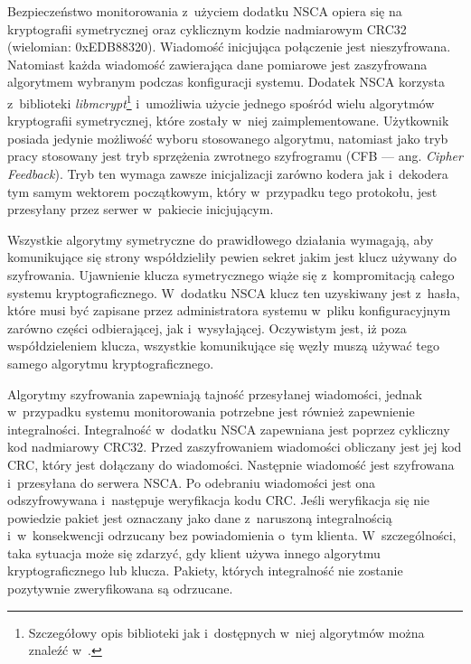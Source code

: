 Bezpieczeństwo monitorowania z~użyciem dodatku NSCA opiera się na
kryptografii symetrycznej oraz cyklicznym kodzie nadmiarowym CRC32
(wielomian: 0xEDB88320). Wiadomość inicjująca połączenie jest
nieszyfrowana. Natomiast każda wiadomość zawierająca dane pomiarowe
jest zaszyfrowana algorytmem wybranym podczas konfiguracji
systemu. Dodatek NSCA korzysta z~biblioteki
{\em libmcrypt}\footnote{Szczegółowy opis biblioteki jak i~dostępnych w~niej
  algorytmów można znaleźć w~\cite{www:libmcrypt}.} i~umożliwia użycie
jednego spośród wielu algorytmów kryptografii symetrycznej, które
zostały w~niej zaimplementowane. Użytkownik posiada jedynie możliwość
wyboru stosowanego algorytmu, natomiast jako tryb pracy stosowany jest
tryb sprzężenia zwrotnego szyfrogramu (CFB --- ang. {\em Cipher
  Feedback}). Tryb ten wymaga zawsze inicjalizacji zarówno kodera jak
i~dekodera tym samym wektorem początkowym, który w~przypadku tego
protokołu, jest przesyłany przez serwer w~pakiecie inicjującym.

Wszystkie algorytmy symetryczne do prawidłowego działania wymagają,
aby komunikujące się strony współdzieliły pewien sekret jakim jest
klucz używany do szyfrowania. Ujawnienie klucza symetrycznego wiąże
się z~kompromitacją całego systemu kryptograficznego. W~dodatku NSCA
klucz ten uzyskiwany jest z~hasła, które musi być zapisane przez
administratora systemu w~pliku konfiguracyjnym zarówno części
odbierającej, jak i~wysyłającej. Oczywistym jest, iż poza
współdzieleniem klucza, wszystkie komunikujące się węzły muszą używać
tego samego algorytmu kryptograficznego.

Algorytmy szyfrowania zapewniają tajność przesyłanej wiadomości,
jednak w~przypadku systemu monitorowania potrzebne jest również
zapewnienie integralności. Integralność w~dodatku NSCA zapewniana jest
poprzez cykliczny kod nadmiarowy CRC32. Przed zaszyfrowaniem
wiadomości obliczany jest jej kod CRC, który jest dołączany do
wiadomości. Następnie wiadomość jest szyfrowana i~przesyłana do
serwera NSCA. Po odebraniu wiadomości jest ona odszyfrowywana
i~następuje weryfikacja kodu CRC. Jeśli weryfikacja się nie powiedzie
pakiet jest oznaczany jako dane z~naruszoną integralnością
i~w~konsekwencji odrzucany bez powiadomienia o~tym
klienta. W~szczególności, taka sytuacja może się zdarzyć, gdy klient
używa innego algorytmu kryptograficznego lub klucza. Pakiety, których
integralność nie zostanie pozytywnie zweryfikowana są odrzucane.

